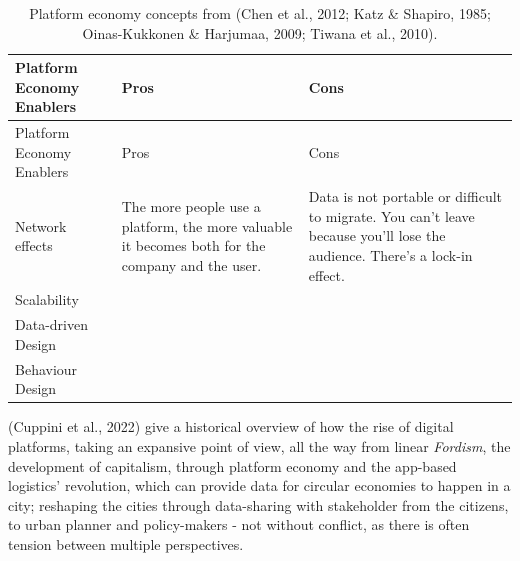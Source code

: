 \documentclass[
  12pt,
  letterpaper,
  DIV=11,
  numbers=noendperiod]{scrartcl}
\begin{document}
\begin{longtable}[]{@{}
  >{\raggedright\arraybackslash}p{}
  >{\raggedright\arraybackslash}p{}
  >{\raggedright\arraybackslash}p{}@{}}
\caption[Platform Economy Concepts]{Platform economy concepts from (Chen
et al., 2012; Katz \& Shapiro, 1985; Oinas-Kukkonen \& Harjumaa, 2009;
Tiwana et al., 2010).}\tabularnewline
\toprule\noalign{}
\begin{minipage}[b]{\linewidth}\raggedright
Platform Economy Enablers
\end{minipage} & \begin{minipage}[b]{\linewidth}\raggedright
Pros
\end{minipage} & \begin{minipage}[b]{\linewidth}\raggedright
Cons
\end{minipage} \\
\midrule\noalign{}
\endfirsthead
\toprule\noalign{}
\begin{minipage}[b]{\linewidth}\raggedright
Platform Economy Enablers
\end{minipage} & \begin{minipage}[b]{\linewidth}\raggedright
Pros
\end{minipage} & \begin{minipage}[b]{\linewidth}\raggedright
Cons
\end{minipage} \\
\midrule\noalign{}
\endhead
\bottomrule\noalign{}
\endlastfoot
Network effects & The more people use a platform, the more valuable it
becomes both for the company and the user. & Data is not portable or
difficult to migrate. You can't leave because you'll lose the audience.
There's a lock-in effect. \\
Scalability & & \\
Data-driven Design & & \\
Behaviour Design & & \\
\end{longtable}

\let\pandoctableshortcapt\relax

(Cuppini et al., 2022) give a historical overview of how the rise of
digital platforms, taking an expansive point of view, all the way from
linear \emph{Fordism}, the development of capitalism, through platform
economy and the app-based logistics' revolution, which can provide data
for circular economies to happen in a city; reshaping the cities through
data-sharing with stakeholder from the citizens, to urban planner and
policy-makers - not without conflict, as there is often tension between
multiple perspectives.
\end{document}
